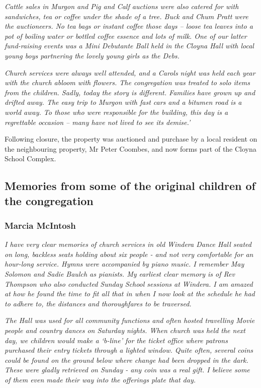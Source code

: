 \emph{Cattle sales in Murgon and Pig and Calf auctions were also catered for with sandwiches, tea or coffee under the shade of a tree. Buck and Chum Pratt were the auctioneers. No tea bags or instant coffee those days -- loose tea leaves into a pot of boiling water or bottled coffee essence and lots of milk. One of our latter fund-raising events was a Mini Debutante Ball held in the Cloyna Hall with local young boys partnering the lovely young girls as the Debs.}



\emph{Church services were always well attended, and a Carols night was held each year with the church abloom with flowers. The congregation was treated to solo items from the children. Sadly, today the story is different. Families have grown up and drifted away. The easy trip to Murgon with fast cars and a bitumen road is a world away. To those who were responsible for the building, this day is a regrettable occasion -- many have not lived to see its demise.'}



Following closure, the property was auctioned and purchase by a local resident on the neighbouring property, Mr Peter Coombes, and now forms part of the Cloyna School Complex.



\subsection{Memories from some of the original children of the congregation}



\subsubsection{Marcia McIntosh}



\emph{I have very clear memories of church services in old Windera Dance Hall seated on long, backless seats holding about six people - and not very comfortable for an hour-long service. Hymns were accompanied by piano music. I remember May Solomon and Sadie Baulch as pianists. My earliest clear memory is of Rev Thompson who also conducted Sunday School sessions at Windera. I am amazed at how he found the time to fit all that in when I now look at the schedule he had to adhere to, the distances and thoroughfares to be traversed.}



\emph{The Hall was used for all community functions and often hosted travelling Movie people and country dances on Saturday nights. When church was held the next day, we children would make a `b-line' for the ticket office where patrons purchased their entry tickets through a lighted window. Quite often, several coins could be found on the ground below where change had been dropped in the dark. These were gladly retrieved on Sunday - any coin was a real gift. I believe some of them even made their way into the offerings plate that day.}



